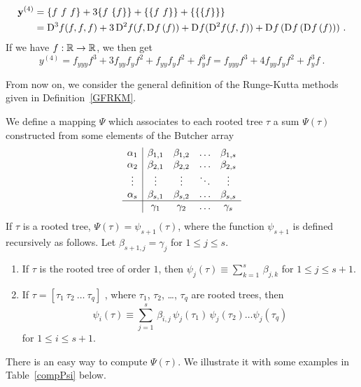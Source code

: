 \begin{egg}
\begin{align*}
\VEC{y}^{(4)} &= \{f\ f\ f\} + 3 \{f \ \{f\}\} + \{\{f \ f\}\} +
\{\{\{f\}\}\} \\
&= \fdiff{f}{3}(f,f,f) + 3\,\fdiff{f}{2}(f,\fdiff{f}{}\,(f)) +
\fdiff{f}{}(\fdiff{f}{2}(f,f)) +
\fdiff{f}{}\,(\fdiff{f}{}\,(\fdiff{f}{}\,(f))) \ .
\end{align*}
If we have $f:\RR\rightarrow \RR$, we then get
\[
y^{(4)} = f_{yyy}f^3 + 3 f_{yy} f_{y} f^2 + f_{yy} f_{y} f^2 +
f_{y}^3f
= f_{yyy}f^3 + 4 f_{yy} f_{y} f^2 + f_{y}^3f \ .
\]
\end{egg}

From now on, we consider the general definition of the Runge-Kutta
methods given in Definition~\ref{GFRKM}.

We define a mapping $\Psi$ which associates to each rooted tree $\tau$
a sum $\Psi(\tau)$ constructed from some elements of the Butcher array
\[
\begin{array}{c|cccc}
\alpha_1 & \beta_{1,1} & \beta_{1,2} & \ldots & \beta_{1,s} \\
\alpha_2 & \beta_{2,1} & \beta_{2,2} & \ldots & \beta_{2,s} \\
\vdots & \vdots & \vdots & \ddots & \vdots \\
\alpha_s & \beta_{s,1} & \beta_{s,2} & \ldots & \beta_{s,s} \\
\hline
 & \gamma_1 & \gamma_2 & \ldots & \gamma_s
\end{array}
\]
If $\tau$ is a rooted tree, $\Psi(\tau) = \psi_{s+1}(\tau)$, where the
function $\psi_{s+1}$ is defined recursively as follows.
Let $\beta_{s+1,j} = \gamma_j$ for $1 \leq j \leq s$.
\begin{enumerate}
\item If $\tau$ is the rooted tree of order $1$,  then
$\displaystyle \psi_j(\tau) \equiv \sum_{k=1}^s\,\beta_{j,k}$
for $1\leq j \leq s+1$.
\item If $\tau = [\tau_1\ \tau_2\ \ldots\ \tau_q]$ , where $\tau_1$,
$\tau_2$, \ldots , $\tau_q$ are rooted trees, then
\[
\psi_i(\tau) \equiv \sum_{j=1}^s\,\beta_{i,j}\,\psi_j(\tau_1)\,\psi_j(\tau_2)
\ldots\psi_j(\tau_q)
\]
for $1\leq i \leq s+1$.
\end{enumerate}

There is an easy way to compute $\Psi(\tau)$.  We illustrate it with
some examples in Table~\ref{compPsi} below.

